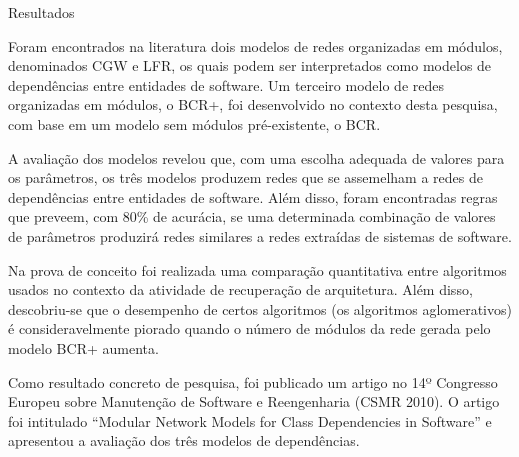 \begin{section}{Resultados}
	
	Foram encontrados na literatura dois modelos de redes organizadas em módulos, denominados CGW e LFR, os quais podem ser interpretados como modelos de dependências entre entidades de software. Um terceiro modelo de redes organizadas em módulos, o BCR+, foi desenvolvido no contexto desta pesquisa, com base em um modelo sem módulos pré-existente, o BCR. 
	
	A avaliação dos modelos revelou que, com uma escolha adequada de valores para os parâmetros, os três modelos produzem redes que se assemelham a redes de dependências entre entidades de software. Além disso, foram encontradas regras que preveem, com 80\% de acurácia, se uma determinada combinação de valores de parâmetros produzirá redes similares a redes extraídas de sistemas de software.
	
	Na prova de conceito foi realizada uma comparação quantitativa entre algoritmos usados no contexto da atividade de recuperação de arquitetura. Além disso, descobriu-se que o desempenho de certos algoritmos (os algoritmos aglomerativos) é consideravelmente piorado quando o número de módulos da rede gerada pelo modelo BCR+ aumenta.
	
	Como resultado concreto de pesquisa, foi publicado um artigo no 14º Congresso Europeu sobre Manutenção de Software e Reengenharia (CSMR 2010). O artigo foi intitulado ``Modular Network Models for Class Dependencies in Software'' e apresentou a avaliação dos três modelos de dependências.

	
\end{section}

